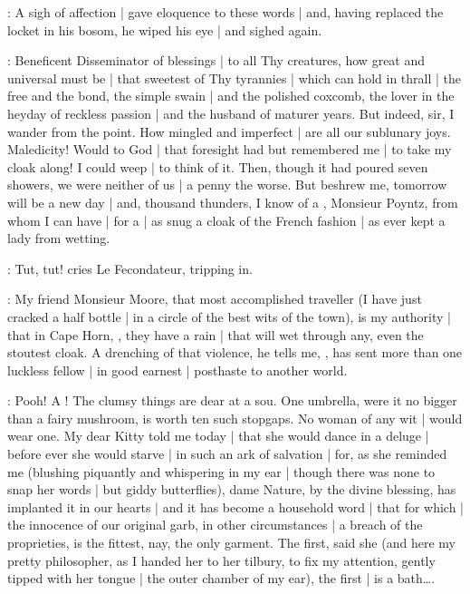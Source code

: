 :
A sigh of affection |
gave eloquence to these words |
and,
having replaced the locket in his bosom,
he wiped his eye |
and sighed again.

\bannon:
Beneficent Disseminator of blessings |
to all Thy creatures,
how great and universal must be |
that sweetest of Thy tyrannies |
which can hold in thrall |
the free and the bond,
the simple swain |
and the polished coxcomb,
the lover in the heyday of reckless passion |
and the husband of maturer years.
But indeed,
sir,
I wander from the point.
How mingled and imperfect |
are all our sublunary joys.
Maledicity!
Would to God |
that foresight had but remembered me |
to take my cloak along!
I could weep |
to think of it.
Then,
though it had poured seven showers,
we were neither of us |
a penny the worse.
But beshrew me,
tomorrow will be a new day |
and,
thousand thunders,
I know of a ,
Monsieur Poyntz,
from whom I can have |
for a  |
as snug a cloak of the French fashion |
as ever kept a lady from wetting.

:
Tut,
tut!
cries Le Fecondateur,
tripping in.

\mulligan:
My friend Monsieur Moore,
that most accomplished traveller
(I have just cracked a half bottle  |
in a circle of the best wits of the town),
is my authority |
that in Cape Horn,
,
they have a rain |
that will wet through any,
even the stoutest cloak.
A drenching of that violence,
he tells me,
,
has sent more than one luckless fellow |
in good earnest |
posthaste to another world.

\lynch:
Pooh!
A !
The clumsy things are dear at a sou.
One umbrella,
were it no bigger than a fairy mushroom,
is worth ten such stopgaps.
No woman of any wit |
would wear one.
My dear Kitty told me today |
that she would dance in a deluge |
before ever she would starve |
in such an ark of salvation |
for,
as she reminded me
(blushing piquantly
and whispering in my ear |
though there was none to snap her words |
but giddy butterflies),
dame Nature,
by the divine blessing,
has implanted it in our hearts |
and it has become a household word |
that 
for which |
the innocence of our original garb,
in other circumstances |
a breach of the proprieties,
is the fittest,
nay,
the only garment.
The first,
said she
(and here my pretty philosopher,
as I handed her to her tilbury,
to fix my attention,
gently tipped with her tongue |
the outer chamber of my ear),
the first |
is a bath\dots.

